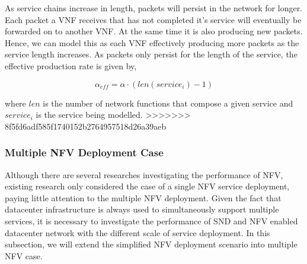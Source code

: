 As service chains increase in length, packets will persist in the network for longer. Each packet a VNF receives that has not completed it's service will eventually be forwarded on to another VNF. At the same time it is also producing new packets. Hence, we can model this as each VNF effectively producing more packets as the service length increases. As packets only persist for the length of the service, the effective production rate is given by,

\begin{equation}
\label{eq:alpha_eff_single}
\alpha_{eff} = \alpha \cdot (len(service_i) - 1)
\end{equation}

\noindent where $len$ is the number of network functions that compose a given service and $service_i$ is the service being modelled.
>>>>>>> 8f5fd6adf585f1740152b2764957518d26a39aeb

\subsubsection{Multiple NFV Deployment Case} \label{multiple}
Although there are several researches investigating the performance of NFV, existing research only considered the case of a single NFV service deployment, paying little attention to the multiple NFV deployment. Given the fact that datacenter infrastructure is always used to simultaneously support multiple services, it is necessary to investigate the performance of SND and NFV enabled datacenter network with the different scale of service deployment. In this subsection, we will extend the simplified NFV deployment scenario into multiple NFV case. 

